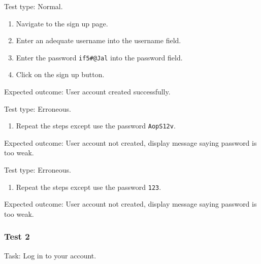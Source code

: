 {\sffamily Test type: Normal.}

\begin{enumerate}
  \item Navigate to the sign up page.
  \item Enter an adequate username into the username field.
  \item Enter the password \texttt{if5\#@Jal} into the password field.
  \item Click on the sign up button.
\end{enumerate}

{\sffamily Expected outcome:} User account created successfully. \\

{\color{gray} \hrulefill}

{\sffamily Test type: Erroneous.}\\

\begin{enumerate}
\item Repeat the steps except use the password \texttt{AopS12v}.\\
\end{enumerate}

{\sffamily Expected outcome:} User account not created, display message saying password is too weak.\\

{\color{gray} \hrulefill}

{\sffamily Test type: Erroneous.} \\

\begin{enumerate}
\item Repeat the steps except use the password \texttt{123}.
\end{enumerate}

{\sffamily Expected outcome:} User account not created, display
message saying password is too weak.\\

{\color{gray} \hrulefill}

\vspace{0.2cm}

\subsubsection{Test 2}

{\sffamily Task:} Log in to your account.\\

{\color{gray} \hrulefill}

